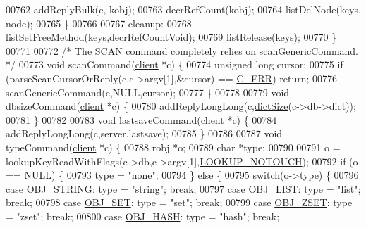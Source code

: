 \begin{DoxyCode}
00762         addReplyBulk(c, kobj);
00763         decrRefCount(kobj);
00764         listDelNode(keys, node);
00765     \}
00766 
00767 cleanup:
00768     \hyperlink{adlist_8h_a648e4a2d20decff3182a72a608b0b8f2}{listSetFreeMethod}(keys,decrRefCountVoid);
00769     listRelease(keys);
00770 \}
00771 
00772 \textcolor{comment}{/* The SCAN command completely relies on scanGenericCommand. */}
00773 \textcolor{keywordtype}{void} scanCommand(\hyperlink{structclient}{client} *c) \{
00774     \textcolor{keywordtype}{unsigned} \textcolor{keywordtype}{long} cursor;
00775     \textcolor{keywordflow}{if} (parseScanCursorOrReply(c,c->argv[1],&cursor) == \hyperlink{server_8h_af98ac28d5f4d23d7ed5985188e6fb7d1}{C\_ERR}) \textcolor{keywordflow}{return};
00776     scanGenericCommand(c,NULL,cursor);
00777 \}
00778 
00779 \textcolor{keywordtype}{void} dbsizeCommand(\hyperlink{structclient}{client} *c) \{
00780     addReplyLongLong(c,\hyperlink{dict_8h_af193430dd3d5579a52b194512f72c1f0}{dictSize}(c->db->dict));
00781 \}
00782 
00783 \textcolor{keywordtype}{void} lastsaveCommand(\hyperlink{structclient}{client} *c) \{
00784     addReplyLongLong(c,server.lastsave);
00785 \}
00786 
00787 \textcolor{keywordtype}{void} typeCommand(\hyperlink{structclient}{client} *c) \{
00788     robj *o;
00789     \textcolor{keywordtype}{char} *type;
00790 
00791     o = lookupKeyReadWithFlags(c->db,c->argv[1],\hyperlink{server_8h_aedc57e62fa05a1b438fa4ed16a803718}{LOOKUP\_NOTOUCH});
00792     \textcolor{keywordflow}{if} (o == NULL) \{
00793         type = \textcolor{stringliteral}{"none"};
00794     \} \textcolor{keywordflow}{else} \{
00795         \textcolor{keywordflow}{switch}(o->type) \{
00796         \textcolor{keywordflow}{case} \hyperlink{server_8h_a65236ea160f69cdef33ec942092af88f}{OBJ\_STRING}: type = \textcolor{stringliteral}{"string"}; \textcolor{keywordflow}{break};
00797         \textcolor{keywordflow}{case} \hyperlink{server_8h_a4a5f22a280949c97a0cb0d4213275126}{OBJ\_LIST}: type = \textcolor{stringliteral}{"list"}; \textcolor{keywordflow}{break};
00798         \textcolor{keywordflow}{case} \hyperlink{server_8h_a8d179375a4aac33d3fa7aa80c8ccc75f}{OBJ\_SET}: type = \textcolor{stringliteral}{"set"}; \textcolor{keywordflow}{break};
00799         \textcolor{keywordflow}{case} \hyperlink{server_8h_a8c356422ddbc03bd77694880a30a1953}{OBJ\_ZSET}: type = \textcolor{stringliteral}{"zset"}; \textcolor{keywordflow}{break};
00800         \textcolor{keywordflow}{case} \hyperlink{server_8h_a87c05ba4f7f36741864277f02a4423fb}{OBJ\_HASH}: type = \textcolor{stringliteral}{"hash"}; \textcolor{keywordflow}{break};

\end{DoxyCode}
